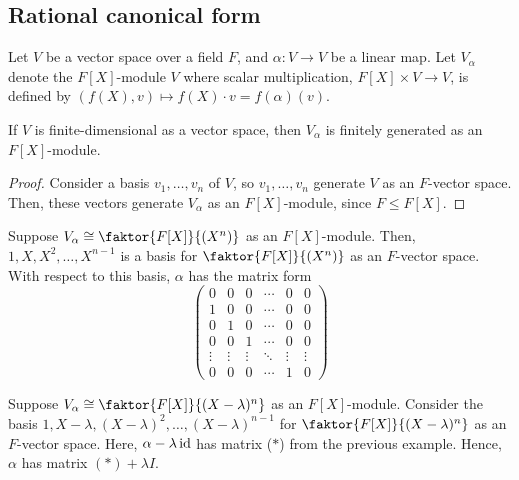 \subsection{Rational canonical form}
Let $V$ be a vector space over a field $F$, and $\alpha : V \to V$ be a linear map.
Let $V_\alpha$ denote the $F[X]$-module $V$ where scalar multiplication, $F[X] \times V \to V$, is defined by $(f(X), v) \mapsto f(X) \cdot v = f(\alpha)(v)$.

\begin{lemma} \label{lem:16.7}
	If $V$ is finite-dimensional as a vector space, then $V_\alpha$ is finitely generated as an $F[X]$-module.
\end{lemma}

\begin{proof}
	Consider a basis $v_1, \dots, v_n$ of $V$, so $v_1, \dots, v_n$ generate $V$ as an $F$-vector space.
	Then, these vectors generate $V_\alpha$ as an $F[X]$-module, since $F \leq F[X]$.
\end{proof}

\begin{example}
	Suppose $V_\alpha \cong \faktor{F[X]}{(X^n)}$ as an $F[X]$-module.
	Then, $1, X, X^2, \dots, X^{n-1}$ is a basis for $\faktor{F[X]}{(X^n)}$ as an $F$-vector space.
	With respect to this basis, $\alpha$ has the matrix form
	\begin{equation}
		\begin{pmatrix}
			0      & 0      & 0      & \cdots & 0      & 0      \\
			1      & 0      & 0      & \cdots & 0      & 0      \\
			0      & 1      & 0      & \cdots & 0      & 0      \\
			0      & 0      & 1      & \cdots & 0      & 0      \\
			\vdots & \vdots & \vdots & \ddots & \vdots & \vdots \\
			0      & 0      & 0      & \cdots & 1      & 0
		\end{pmatrix}
		\tag{\(\ast\)}
	\end{equation}
\end{example}

\begin{example}
	Suppose $V_\alpha \cong \faktor{F[X]}{(X-\lambda)^n}$ as an $F[X]$-module.
	Consider the basis $1, X-\lambda, (X-\lambda)^2, \dots, (X-\lambda)^{n-1}$ for $\faktor{F[X]}{(X-\lambda)^n}$ as an $F$-vector space.
	Here, $\alpha - \lambda \operatorname{id}$ has matrix (\(\ast\)) from the previous example.
	Hence, $\alpha$ has matrix $(\ast) + \lambda I$.
\end{example}

